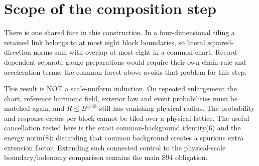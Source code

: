 \documentclass{article}
\begin{document}
\section*{Scope of the composition step}
There is one shared face in this construction. In a four-dimensional tiling a retained link belongs to at most eight block boundaries, so literal squared-direction norms sum with overlap at most eight in a common chart. Record-dependent separate gauge preparations would require their own chain rule and acceleration terms; the common forest above avoids that problem for this step.

This result is NOT a scale-uniform induction. On repeated enlargement the chart, reference harmonic field, exterior law and event probabilities must be matched again, and $R\le B^{1/48}$ still has vanishing physical radius. The probability and response errors per block cannot be tiled over a physical lattice. The useful cancellation tested here is the exact common-background identity(6) and the energy norm(8): discarding that common background creates a spurious extra extension factor. Extending such connected control to the physical-scale boundary/holonomy comparison remains the main S94 obligation.
\end{document}
